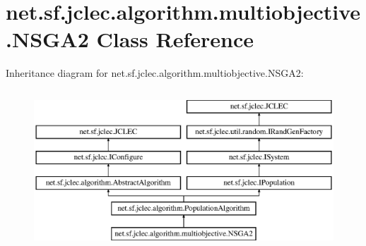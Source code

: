 \hypertarget{classnet_1_1sf_1_1jclec_1_1algorithm_1_1multiobjective_1_1_n_s_g_a2}{\section{net.\-sf.\-jclec.\-algorithm.\-multiobjective.\-N\-S\-G\-A2 Class Reference}
\label{classnet_1_1sf_1_1jclec_1_1algorithm_1_1multiobjective_1_1_n_s_g_a2}
}
Inheritance diagram for net.\-sf.\-jclec.\-algorithm.\-multiobjective.\-N\-S\-G\-A2\-:\begin{figure}[H]
\begin{center}
\leavevmode
\includegraphics[height=6.000000cm]{classnet_1_1sf_1_1jclec_1_1algorithm_1_1multiobjective_1_1_n_s_g_a2}
\end{center}
\end{figure}
